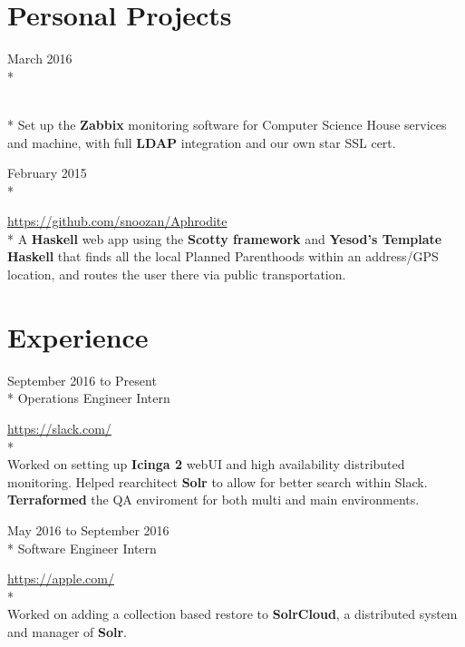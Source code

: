 \documentclass[a4paper,margin,line]{resume}
\newcommand{\rurl}[1]{\hfill {\footnotesize \url{#1}}}
\newcommand{\rdate}[1]{\hfill {\small #1}}
\newcommand{\rproject}[4]{\item[#1] \hfill \rdate{#2} \\* \hfill \rdate{#3} \strut\hfill \rurl{#4} \\*}
\begin{document}
\begin{resume}
\section{\mysidestyle Personal Projects}
    \begin{asparadesc}
        \rproject{Zabbix for Computer Science House}{March 2016}{}{}
        \small
        Set up the {\bf Zabbix} monitoring software for Computer Science House services 
        and machine, with full {\bf LDAP} integration and our own star SSL cert.
        \normalsize
        \\
        \rproject{Aphrodite}{February 2015}{}{https://github.com/snoozan/Aphrodite}
        \small
        A {\bf Haskell} web app using the {\bf Scotty framework} and {\bf Yesod's Template Haskell} 
        that finds all the local Planned Parenthoods within an address/GPS location, and routes the user
        there via public transportation.
        \normalsize
    \end{asparadesc}

\section{\mysidestyle Experience}
	\begin{asparadesc}
        \rproject{Slack}{September 2016 to Present}{Operations Engineer Intern}{https://slack.com/}
        \\
        \small
        Worked on setting up {\bf Icinga 2} webUI and high availability distributed monitoring. Helped
        rearchitect {\bf Solr} to allow for better search within Slack. {\bf Terraformed} the QA enviroment
        for both multi and main environments.
        \normalsize
        \\

        \rproject{Apple}{May 2016 to September 2016}{Software Engineer Intern}{https://apple.com/}
        \\
        \small
        Worked on adding a collection based restore to {\bf SolrCloud}, a distributed system and manager
        of {\bf Solr}.
        \normalsize
        \\


\end{asparadesc}
\end{resume}
\end{document}
